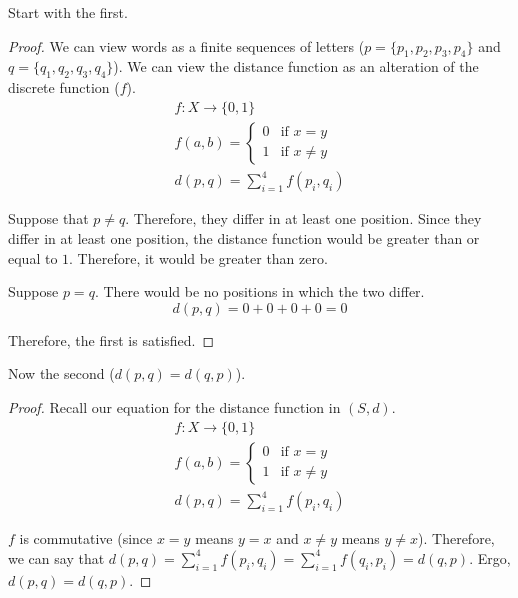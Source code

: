 \documentclass[11pt]{article}
\begin{document}
        Start with the first.
        \begin{proof}
            We can view words as a finite sequences of letters ($p = \{p_1, p_2, p_3, p_4\}$ and $q = \{q_1, q_2, q_3, q_4\}$).
            We can view the distance function as an alteration of the discrete function ($f$).
            \begin{gather}
                f: X \to \{0, 1\}\\
                f(a,b) = \begin{cases}
                    0   &\text{if } x = y\\
                    1   &\text{if } x \neq y
                \end{cases}\\
                d(p,q) = \sum_{i = 1}^{4} f(p_i, q_i)
            \end{gather} 

            Suppose that $p \neq q$.
            Therefore, they differ in at least one position.
            Since they differ in at least one position, the distance function would be greater than or equal to $1$.
            Therefore, it would be greater than zero.

            Suppose $p = q$.
            There would be no positions in which the two differ.
            \begin{equation}
                d(p,q) = 0 + 0 + 0 + 0 = 0
            \end{equation}
            
            Therefore, the first is satisfied.
        \end{proof}

        Now the second ($d(p,q) = d(q,p)$).
        \begin{proof}
            Recall our equation for the distance function in $(S,d)$.
            \begin{gather}
                f: X \to \{0, 1\}\\
                f(a,b) = \begin{cases}
                    0   &\text{if } x = y\\
                    1   &\text{if } x \neq y
                \end{cases}\\
                d(p,q) = \sum_{i = 1}^{4} f(p_i, q_i)
            \end{gather} 
            
            $f$ is commutative (since $x = y$ means $y = x$ and $x \neq y$ means $y \neq x$).
            Therefore, we can say that $d(p,q) = \sum_{i = 1}^{4} f(p_i, q_i) = \sum_{i = 1}^{4} f(q_i, p_i) = d(q,p)$.
            Ergo, $d(p,q) = d(q,p)$.
        \end{proof}
\end{document}

